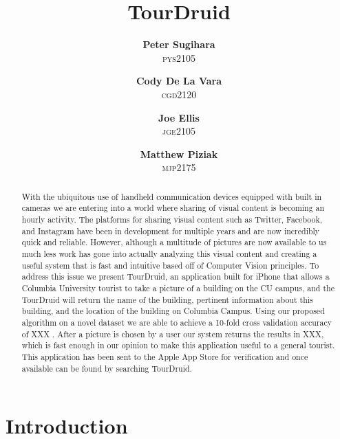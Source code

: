 \documentclass[twocolumn]{article}
\title{TourDruid}
\author{\textbf{Peter Sugihara}\\ \textsc{pys2105}
\and \textbf{Cody De La Vara}\\ \textsc{cgd2120}
\and \textbf{Joe Ellis}\\ \textsc{jge2105}
\and \textbf{Matthew Piziak}\\ \textsc{mjp2175}}
\newcommand{\sectionfile}[3]{\section{#1} \label{sec:#2} }
\begin{document}
\maketitle

\begin{abstract}

With the ubiquitous use of handheld communication devices equipped with built in cameras we are entering into a world where sharing of visual content is becoming an hourly activity.
The platforms for sharing visual content such as Twitter, Facebook, and Instagram have been in development for multiple years and are now incredibly quick and reliable.
However, although a multitude of pictures are now available to us much less work has gone into actually analyzing this visual content and creating a useful system that is fast and intuitive based off of Computer Vision principles.
To address this issue we present TourDruid, an application built for iPhone that allows a Columbia University tourist to take a picture of a building on the CU campus, and the TourDruid will return the name of the building, pertinent information about this building, and the location of the building on Columbia Campus.
Using our proposed algorithm on a novel dataset we are able to achieve a 10-fold cross validation accuracy of {\color{red} XXX }.  
After a picture is chosen by a user our system returns the results in {\color{red} XXX}, which is fast enough in our opinion to make this application useful to a general tourist.
This application has been sent to the Apple App Store for verification and once available can be found by searching TourDruid.

\end{abstract}


\newpage

\sectionfile{Introduction}{introduction}{introduction.tex}
\end{document}
